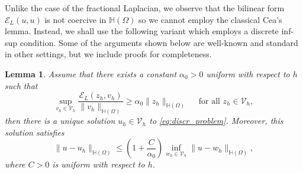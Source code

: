 \documentclass[11 pt]{article}
\newtheorem{lemma}[theorem]{Lemma}
\numberwithin{equation}{section}
\def\cE{\mathcal{E}}
\begin{document}
Unlike the case of the fractional Laplacian, we observe that the bilinear form $\cE_{L}(u,u)$ is not coercive in $\mathbb H(\Omega)$ so we cannot employ the classical Cea's lemma. Instead, we shall use the following variant which employs a discrete inf-sup condition. Some of the arguments shown below are well-known and standard in other settings, but we include proofs for completeness.
%
\begin{lemma}\label{lem:cea_mg}
Assume that there exists a constant $\alpha_0>0$ uniform with respect to $h$ such that
%
\begin{equation}\label{eq:discr_inf_sup}
    \sup_{v_h\in \mathcal V_h}\frac{\cE_{L}(z_h,v_h)}{\|v_h\|_{\mathbb H(\Omega)}}\geq \alpha_0\|z_h\|_{\mathbb H(\Omega)} \quad\text{ for all } z_h\in\mathcal V_h,
\end{equation}
%
then there is a unique solution $u_h\in \mathcal V_h$ to \eqref{eq:discr_problem}. Moreover, this solution satisfies
%
\begin{equation}\label{eq:stability_cea}
    \|u-u_h\|_{\mathbb H(\Omega)}\leq \left(1+\frac{C}{\alpha_0}\right)\inf_{w_h\in\mathcal V_h}\|u-w_h\|_{\mathbb H(\Omega)},
\end{equation}
%
where $C>0$ is uniform with respect to $h$.
\end{lemma}
%
\end{document}
